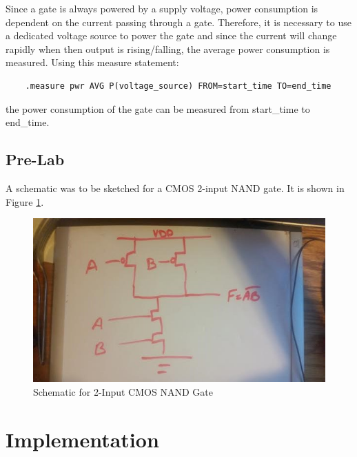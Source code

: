 \documentclass[12pt]{article}
\begin{document}
Since a gate is always powered by a supply voltage, power consumption is dependent on the current passing through a gate. Therefore, it is necessary to use a dedicated voltage source to power the gate and since the current will change rapidly when then output is rising/falling, the average power consumption is measured. Using this measure statement:
\begin{lstlisting}
	.measure pwr AVG P(voltage_source) FROM=start_time TO=end_time
\end{lstlisting}
the power consumption of the gate can be measured from start\_time to end\_time.
\subsection{Pre-Lab}
A schematic was to be sketched for a CMOS 2-input NAND gate. It is shown in Figure \ref{fig:pre-lab}.

\begin{figure}
\centering
\includegraphics[width=\linewidth]{pre-lab}
\caption{Schematic for 2-Input CMOS NAND Gate}
\label{fig:pre-lab}
\end{figure}

\section{Implementation}
\end{document}
